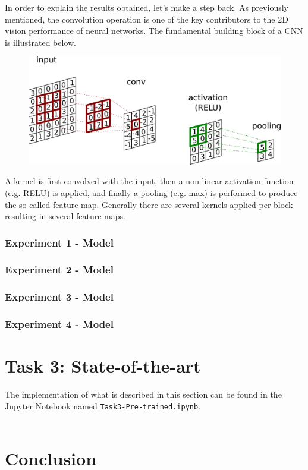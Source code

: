 \documentclass[11pt,a4paper]{article}
\begin{document}
In order to explain the results obtained, let's make a step back. As previously mentioned, the convolution operation is one of the key contributors to the 2D vision performance of neural networks. The fundamental building block of a CNN is illustrated below.
\begin{figure}[H]
    \centering
    \includegraphics[scale=0.1]{imgs/conv.png}
\end{figure}
\noindent
A kernel is first convolved with the input, then a non linear activation function (e.g. RELU) is applied, and finally a pooling (e.g. max) is performed to produce the so called feature map. Generally there are several kernels applied per block resulting in several feature maps.
\subsubsection{Experiment 1 - Model}
\subsubsection{Experiment 2 - Model}
\subsubsection{Experiment 3 - Model}
\subsubsection{Experiment 4 - Model}

\newpage
\section{Task 3: State-of-the-art}
The implementation of what is described in this section can be found in the Jupyter Notebook named \texttt{Task3-Pre-trained.ipynb}.\\
\\


\newpage
\section{Conclusion}

\newpage
\nocite{kerasiopointnet}
\nocite{mediumcomkfoldcrossvalidation}
\printbibliography
\end{document}
